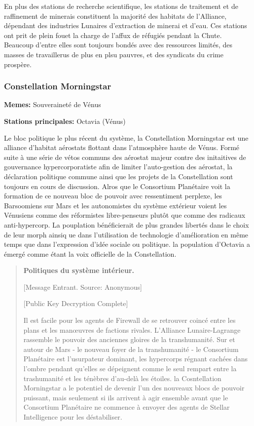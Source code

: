 En plus des stations de recherche scientifique, les stations de traitement et de raffinement de minerais constituent la majorité des habitats de l'Alliance, dépendant des industries Lunaires d'extraction de minerai et d'eau. Ces stations ont prit de plein fouet la charge de l'affux de réfugiés pendant la Chute. Beaucoup d'entre elles sont toujours bondés avec des ressources limités, des masses de travaillerus de plus en plsu pauvres, et des syndicats du crime prospère. 

\subsubsection{Constellation Morningstar} \label{sec:morn-const} 

\textbf{Memes:} Souveraineté de Vénus 

\textbf{Stations principales:} Octavia (Vénus) 

Le bloc politique le plus récent du système, la Constellation Morningstar est une alliance d'habitat aérostats flottant dans l'atmosphère haute de Vénus. Formé suite à une série de vétos communs des aérostat majeur contre des initaitives de gouvernance hypercorporatiste afin de limiter l'auto-gestion des aérostat, la déclaration politique commune ainsi que les projets de la Constellation sont toujours en cours de discussion. Alros que le Consortium Planétaire voit la formation de ce nouveau bloc de pouvoir avec ressentiment perplexe, les Barsoomiens sur Mars et les autonomistes du système extérieur voient les Vénusiens comme des réformistes libre-penseurs plutôt que comme des radicaux anti-hypercorp. La pouplation bénéficierait de plus grandes libertés dans le choix de leur morph ainsiq ue dans l'utilisation de technologie d'amélioration en même temps que dans l'expression d'idée sociale ou politique. la population d'Octavia a émergé comme étant la voix officielle de la Constellation. 

\begin{quotation} \textbf{Politiques du système intérieur.} 

[Message Entrant. Source: Anonymous] 

[Public Key Decryption Complete] 

Il est facile pour les agents de Firewall de se retrouver coincé entre les plans et les manœuvres de factions rivales. L'Alliance Lunaire-Lagrange rassemble le pouvoir des anciennes gloires de la transhumanité. Sur et autour de Mars - le nouveau foyer de la transhumanité - le Consortium Planétaire est l'usurpateur dominant, les hypercorps régnant cachées dans l'ombre pendant qu'elles se dépeignent comme le seul rempart entre la trashumanité et les ténèbres d'au-delà les étoiles. la Cosntellation Morningstar a le potentiel de devenir l'un des nouveaux blocs de pouvoir puissant, mais seulement si ils arrivent à agir ensemble avant que le Consortium Planétaire ne commence à envoyer des agents de Stellar Intelligence pour les déstabiliser. \end{quotation} 

